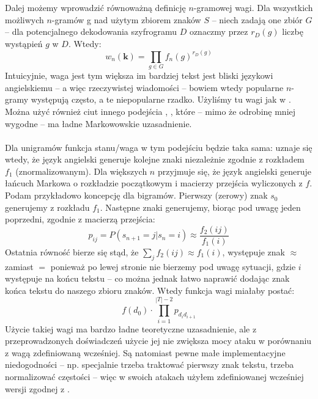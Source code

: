 \documentclass[a4paper]{article}
\theoremstyle{defn}
\theoremstyle{theorem}
\theoremstyle{lemma}
\theoremstyle{cor}
\theoremstyle{fact}
\begin{document}
Dalej możemy wprowadzić równoważną definicję $n$-gramowej wagi. Dla wszystkich możliwych $n$-gramów g nad użytym zbiorem znaków $S$ – niech zadają one zbiór $G$ – dla potencjalnego dekodowania szyfrogramu $D$ oznaczmy przez $r_D(g)$ liczbę wystąpień $g$ w $D$. Wtedy:
$$w_n(\boldsymbol{k}) = \prod\limits_{g \in G} f_n(g)^{r_D(g)}$$
Intuicyjnie, waga jest tym większa im bardziej tekst jest bliski językowi angielskiemu – a więc rzeczywistej wiadomości – bowiem wtedy popularne $n$-gramy występują często, a te niepopularne rzadko. Użyliśmy tu wagi jak w \cite{Chen&Rosenthal}. Można użyć również ciut innego podejścia \cite{Connor}, \cite{Diaconis}, które – mimo że odrobinę mniej wygodne – ma ładne Markowowskie uzasadnienie.\\\\
Dla unigramów funkcja stanu/waga w tym podejściu będzie taka sama: uznaje się wtedy, że język angielski generuje kolejne znaki niezależnie zgodnie z rozkładem $f_1$ (znormalizowanym). Dla większych $n$ przyjmuje się, że język angielski generuje łańcuch Markowa o rozkładzie początkowym i macierzy przejścia wyliczonych z $f$. Podam przykładowo koncepcję dla bigramów. Pierwszy (zerowy) znak $s_0$ generujemy z rozkładu $f_1$. Następne znaki generujemy, biorąc pod uwagę jeden poprzedni, zgodnie z macierzą przejścia:
$$p_{ij} = P(s_{n+1} = j|s_n = i) \approx \frac{f_2(ij)}{f_1(i)}$$
Ostatnia równość bierze się stąd, że $\sum_j f_2(ij) \approx f_1(i)$, występuje znak $\approx$ zamiast $=$ ponieważ po lewej stronie nie bierzemy pod uwagę sytuacji, gdzie $i$ występuje na końcu tekstu – co można jednak łatwo naprawić dodając znak końca tekstu do naszego zbioru znaków. Wtedy funkcja wagi miałaby postać:
$$ f(d_0) \cdot \prod\limits_{i=1}^{|T|-2} p_{{d_i}{d_{i+1}}} $$
Użycie takiej wagi ma bardzo ładne teoretyczne uzasadnienie, ale z przeprowadzonych doświadczeń użycie jej nie zwiększa mocy ataku w porównaniu z wagą zdefiniowaną wcześniej. Są natomiast pewne małe implementacyjne niedogodności – np. specjalnie trzeba traktować pierwszy znak tekstu, trzeba normalizować częstości – więc w swoich atakach użyłem zdefiniowanej wcześniej wersji zgodnej z \cite{Chen&Rosenthal}.\\
\end{document}
